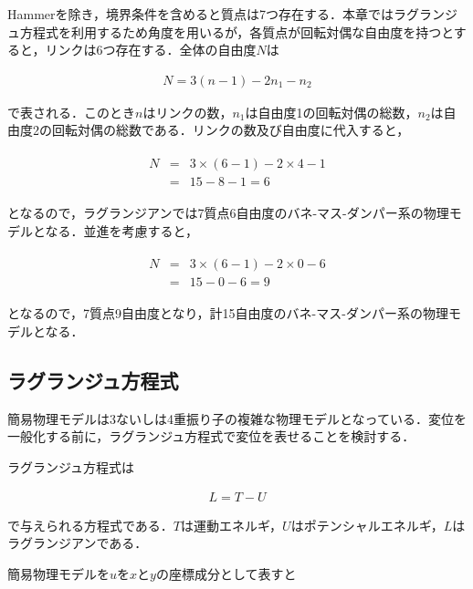 Hammerを除き，境界条件を含めると質点は7つ存在する．本章ではラグランジュ方程式を利用するため角度を用いるが，各質点が回転対偶な自由度を持つとすると，リンクは6つ存在する．全体の自由度$N$は

\begin{eqnarray}
    N = 3(n - 1) - 2n_1-n_2
\end{eqnarray}

で表される．このとき$n$はリンクの数，$n_1$は自由度1の回転対偶の総数，$n_2$は自由度2の回転対偶の総数である．リンクの数及び自由度に代入すると，

\begin{eqnarray}
    \begin{matrix}
        N &=& 3\times (6 - 1) - 2 \times 4 - 1 \\
          &=& 15 - 8 - 1 = 6
    \end{matrix}
\end{eqnarray}

となるので，ラグランジアンでは7質点6自由度のバネ-マス-ダンパー系の物理モデルとなる．並進を考慮すると，

\begin{eqnarray}
    \begin{matrix}
        N &=& 3\times (6 - 1) - 2 \times 0 - 6 \\
          &=& 15 - 0 - 6 = 9
    \end{matrix}
\end{eqnarray}

となるので，7質点9自由度となり，計15自由度のバネ-マス-ダンパー系の物理モデルとなる．



\subsection{ラグランジュ方程式}

簡易物理モデルは3ないしは4重振り子の複雑な物理モデルとなっている．変位を一般化する前に，ラグランジュ方程式で変位を表せることを検討する．

ラグランジュ方程式は

\begin{eqnarray}
    L = T - U    
\end{eqnarray}

で与えられる方程式である．$T$は運動エネルギ，$U$はポテンシャルエネルギ，$L$はラグランジアンである．

簡易物理モデルを$u$を$x$と$y$の座標成分として表すと

